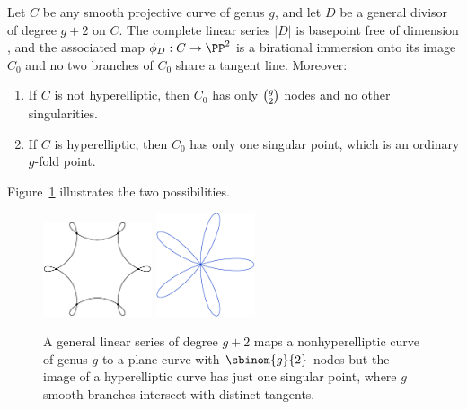 \begin{theorem}\label{needed for nodes}
Let $C$ be any smooth projective curve of genus $g$, and let $D$ be a
general divisor of degree $g+2$ on $C$.
The complete linear series $|D|$ is basepoint free of dimension \2,
and the associated map $\phi_D: C\to \PP^2$
 is a
birational
immersion
% 
onto its image $C_0$ 
and no two branches of $C_0$ share a tangent line. 
Moreover:

\begin{enumerate}
\item If $C$ is not hyperelliptic, then $C_0$ has only $\tbinom{g}{2}$
nodes and no other singularities. 
\item If $C$ is hyperelliptic,  
then
$C_0$ has only one singular point,
  which is an ordinary $g$-fold point.
\end{enumerate}
\end{theorem}

Figure~\ref{Fig9.4} illustrates the two possibilities.

\begin{figure}
\leavevmode{}\hbox{\includegraphics[height=1.1in]{main/Fig09-4A}}
\qquad
\includegraphics[height=1.2in]{main/five}
\caption{A general linear series of degree $g+2$ maps a nonhyperelliptic
curve of genus $g$
to a plane curve with $\protect\sbinom{g}{2}$ nodes 
but the image of a
hyperelliptic curve has
just one singular point, where $g$ smooth branches intersect with
distinct tangents.
}
\label{Fig9.4}
\end{figure}

